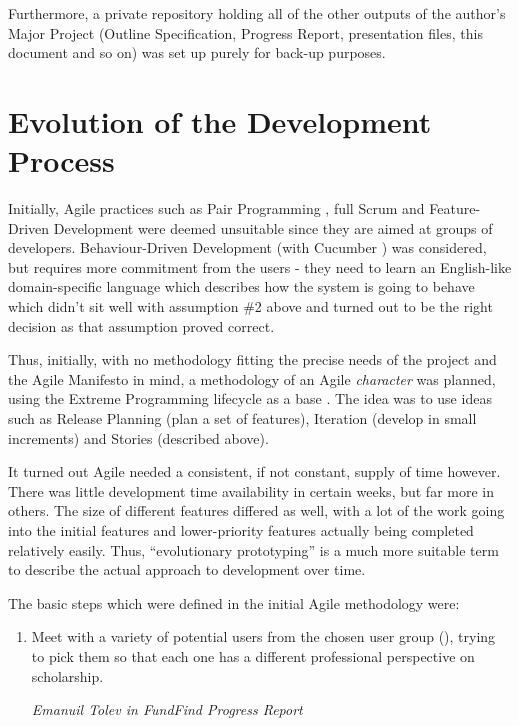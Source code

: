 Furthermore, a private repository holding all of the other outputs of the author's Major Project (Outline Specification, Progress Report, presentation files, this document and so on) was set up purely for back-up purposes.

\section{Evolution of the Development Process}
Initially, Agile practices such as Pair Programming \cite{pairprg}, full Scrum \cite{Scrum} and Feature-Driven Development were deemed unsuitable since they are aimed at groups of developers. Behaviour-Driven Development (with Cucumber \cite{cucumber}) was considered, but requires more commitment from the users - they need to learn an English-like domain-specific language which describes how the system is going to behave which didn't sit well with assumption \#2 above and turned out to be the right decision as that assumption proved correct.

Thus, initially, with no methodology fitting the precise needs of the project and the Agile Manifesto \cite{agile-manifesto} in mind, a methodology of an Agile \emph{character} was planned, using the Extreme Programming lifecycle as a base \cite{xp-lifecycle}. The idea was to use ideas such as Release Planning (plan a set of features), Iteration (develop in small increments) and Stories (described above).

It turned out Agile needed a consistent, if not constant, supply of time however. There was little development time availability in certain weeks, but far more in others. The size of different features differed as well, with a lot of the work going into the initial features and lower-priority features actually being completed relatively easily. Thus, ``evolutionary prototyping'' is a much more suitable term to describe the actual approach to development over time.

The basic steps which were defined in the initial Agile methodology were:
\begin{shadequote}
\begin{enumerate}
	\item Meet with a variety of potential users from the chosen user group (), trying to pick them so that each one has a different professional perspective on scholarship.
	\par\emph{Emanuil Tolev in FundFind Progress Report \cite{progress-report}}
	\setcounter{tmpc}{\theenumi}
\end{enumerate}
\end{shadequote}

